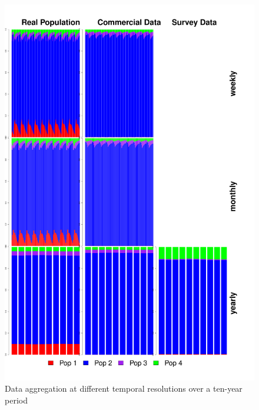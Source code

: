 \documentclass[review]{elsarticle}
\begin{document}
\begin{figure}[!ht]
	\includegraphics[width =\linewidth]{../analysis/Data_Aggregation_time_Rev}
	\caption{Data aggregation at different temporal resolutions over a
		ten-year period}
	\label{fig:2}
\end{figure}	
\end{document}
